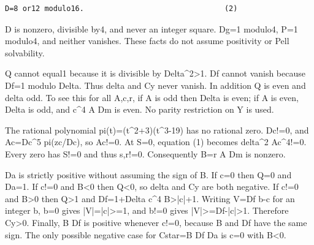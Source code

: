 \begin{verbatim}
D=8 or12 modulo16.                                (2)
\end{verbatim}

D is nonzero, divisible by4, and never an integer square. Dg=\allowbreak{}1 modulo4, P=\allowbreak{}1 modulo4, and neither vanishes. These facts do not assume positivity or Pell solvability.



Q cannot equal1 because it is divisible by Delta\textasciicircum{}\allowbreak{}2\textgreater{}\allowbreak{}1. Df cannot vanish because Df=\allowbreak{}1 modulo Delta. Thus delta and Cy never vanish. In addition Q is even and delta odd. To see this for all A,c,r, if A is odd then Delta is even; if A is even, Delta is odd, and c\textasciicircum{}\allowbreak{}4 A Dm is even. No parity restriction on Y is used.



The rational polynomial pi(t)=\allowbreak{}(t\textasciicircum{}\allowbreak{}2+\allowbreak{}3)(t\textasciicircum{}\allowbreak{}3-19) has no rational zero. Dc!=\allowbreak{}0, and Ac=\allowbreak{}Dc\textasciicircum{}\allowbreak{}5 pi(zc/\allowbreak{}Dc), so Ac!=\allowbreak{}0. At S=\allowbreak{}0, equation (1) becomes delta\textasciicircum{}\allowbreak{}2 Ac\textasciicircum{}\allowbreak{}4!=\allowbreak{}0. Every zero has S!=\allowbreak{}0 and thus s,r!=\allowbreak{}0. Consequently B=\allowbreak{}r A Dm is nonzero.



Da is strictly positive without assuming the sign of B. If c=\allowbreak{}0 then Q=\allowbreak{}0 and Da=\allowbreak{}1. If c!=\allowbreak{}0 and B\textless{}\allowbreak{}0 then Q\textless{}\allowbreak{}0, so delta and Cy are both negative. If c!=\allowbreak{}0 and B\textgreater{}\allowbreak{}0 then Q\textgreater{}\allowbreak{}1 and Df=\allowbreak{}1+\allowbreak{}Delta c\textasciicircum{}\allowbreak{}4 B\textgreater{}\allowbreak{}|c|+\allowbreak{}1. Writing V=\allowbreak{}Df b-c for an integer b, b=\allowbreak{}0 gives |V|=\allowbreak{}|c|\textgreater{}\allowbreak{}=\allowbreak{}1, and b!=\allowbreak{}0 gives |V|\textgreater{}\allowbreak{}=\allowbreak{}Df-|c|\textgreater{}\allowbreak{}1. Therefore Cy\textgreater{}\allowbreak{}0. Finally, B Df is positive whenever c!=\allowbreak{}0, because B and Df have the same sign. The only possible negative case for Cstar=\allowbreak{}B Df Da is c=\allowbreak{}0 with B\textless{}\allowbreak{}0.



